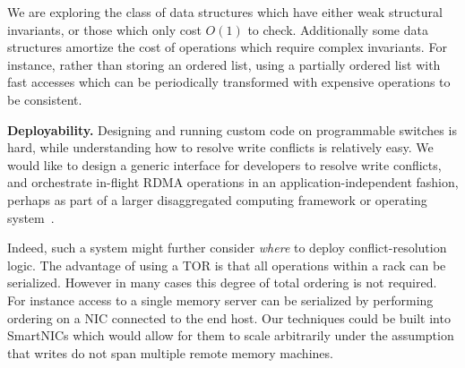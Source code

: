 We are exploring the class of data structures which have
either weak structural invariants, or those which only cost $O(1)$ to
check. Additionally some data structures amortize the cost of
operations which require complex invariants. For instance, rather than
storing an ordered list, using a partially ordered list with fast
accesses which can be periodically transformed with expensive
operations to be consistent.




\textbf{Deployability.}
Designing and running custom code on programmable switches is hard,
while understanding how to resolve write conflicts is relatively
easy. We would like to design a generic interface for developers to
resolve write conflicts, and orchestrate in-flight RDMA operations in
an application-independent fashion, perhaps as part of a larger
disaggregated computing framework or operating system~\cite{legoos}.

Indeed, such a system might further consider \emph{where} to deploy
conflict-resolution logic.  The advantage of using a TOR is that all
operations within a rack can be serialized. However in many cases this
degree of total ordering is not required. For instance access to a
single memory server can be serialized by performing ordering on a NIC
connected to the end host. Our techniques could be built into
SmartNICs which would allow for them to scale arbitrarily under the
assumption that writes do not span multiple remote memory machines.








